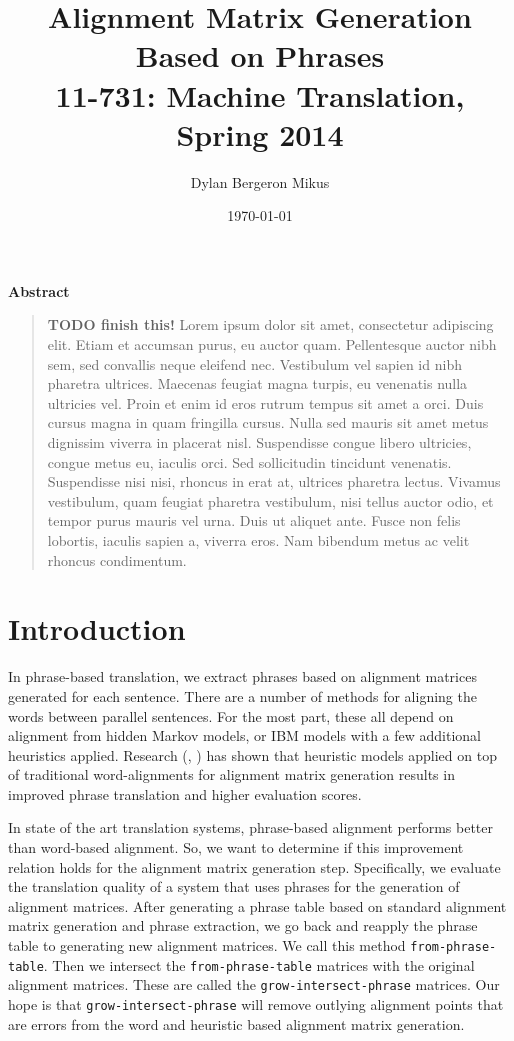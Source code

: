 \documentclass[twocolumn]{article}
\title{Alignment Matrix Generation Based on Phrases \\
  11-731: Machine Translation, Spring 2014}
\date{\today}
\author{Dylan Bergeron Mikus}
\newcommand{\phraseAlign}{\texttt{from-phrase-table}}
\newcommand{\phraseIntersectAlign}{\texttt{grow-intersect-phrase}}
\begin{document}
\maketitle{}

\begin{center}
\Large{\textbf{Abstract}}
\end{center}
\begin{quotation}
  \small{
    \textbf{TODO finish this!}
    Lorem ipsum dolor sit amet, consectetur adipiscing elit. Etiam et accumsan
    purus, eu auctor quam. Pellentesque auctor nibh sem, sed convallis neque
    eleifend nec. Vestibulum vel sapien id nibh pharetra ultrices. Maecenas
    feugiat  magna turpis, eu venenatis nulla ultricies vel. Proin et enim id
    eros rutrum  tempus sit amet a orci. Duis cursus magna in quam fringilla
    cursus. Nulla sed  mauris sit amet metus dignissim viverra in placerat
    nisl. Suspendisse congue  libero ultricies, congue metus eu, iaculis
    orci. Sed sollicitudin tincidunt venenatis. Suspendisse nisi nisi, rhoncus
    in erat at, ultrices pharetra lectus. Vivamus vestibulum, quam feugiat
    pharetra vestibulum, nisi tellus auctor odio, et tempor purus mauris vel
    urna. Duis ut aliquet ante. Fusce non felis lobortis, iaculis sapien a,
    viverra eros. Nam bibendum metus ac velit rhoncus condimentum.
  }
\end{quotation}


\section{Introduction}
In phrase-based translation, we extract phrases based on alignment matrices
generated for each sentence. There are a number of methods for aligning the
words between parallel sentences. For the most part, these all depend on
alignment from hidden Markov models, or IBM models with a few additional
heuristics applied. Research (\cite{wuwang2007}, \cite{dgzk2006}) has shown that
heuristic models applied on top of traditional word-alignments for alignment
matrix generation results in improved phrase translation and higher evaluation
scores.

In state of the art translation systems, phrase-based alignment performs better
than word-based alignment. So, we want to determine if this improvement relation
holds for the alignment matrix generation step. Specifically, we evaluate the
translation quality of a system that uses phrases for the generation of
alignment matrices. After generating a phrase table based on standard alignment
matrix generation and phrase extraction, we go back and reapply the phrase table
to generating new alignment matrices. We call this method \phraseAlign{}.
Then we intersect the \phraseAlign{} matrices with the original alignment
matrices. These are called the \phraseIntersectAlign{} matrices.
Our hope is that \phraseIntersectAlign{} will remove outlying alignment points
that are errors from the word and heuristic based alignment matrix generation.
\end{document}
